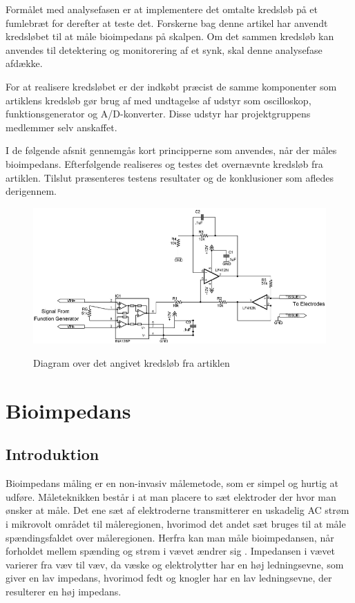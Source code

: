 Formålet med analysefasen er at implementere det omtalte kredsløb på et fumlebræt for derefter at teste det. Forskerne bag denne artikel har anvendt kredsløbet til at måle bioimpedans på skalpen. Om det sammen kredsløb kan anvendes til detektering og monitorering af et synk, skal denne analysefase afdække.

For at realisere kredsløbet er der indkøbt præcist de samme komponenter  som artiklens kredsløb gør brug af med undtagelse af udstyr som oscilloskop, funktionsgenerator og A/D-konverter. Disse udstyr har projektgruppens medlemmer selv anskaffet. 

I de følgende afsnit gennemgås kort principperne som anvendes, når der måles bioimpedans.  Efterfølgende realiseres og testes det overnævnte kredsløb fra artiklen. Tilslut præsenteres testens resultater og de konklusioner som afledes derigennem.



\begin{figure}[H]
\centering
{\includegraphics[width=\linewidth]
{Figure/BIdiagram}}
\caption{Diagram over det angivet kredsløb fra artiklen\cite{Aroom2009}}
\label{fig:BIdiagram}
\end{figure}


\chapter{Bioimpedans}
\section{Introduktion}
Bioimpedans måling  er en non-invasiv målemetode, som er simpel og hurtig at udføre. Måleteknikken består i at man placere to sæt elektroder der hvor man ønsker at måle. Det ene sæt af elektroderne transmitterer  en uskadelig AC strøm i mikrovolt området til måleregionen, hvorimod det andet sæt bruges til at måle spændingsfaldet over måleregionen. Herfra kan man måle bioimpedansen, når forholdet mellem spænding og strøm i vævet ændrer sig . Impedansen i vævet varierer fra væv til væv, da væske og elektrolytter har en høj ledningsevne, som giver en lav impedans, hvorimod fedt og knogler har en lav ledningsevne, der resulterer en høj impedans.\cite{Brantlov2017} 
 
